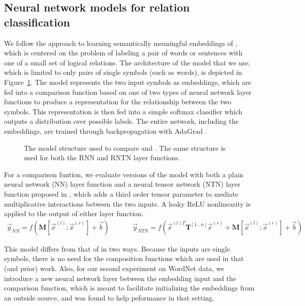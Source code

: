 
\subsection*{Neural network models for relation classification} \label{methods}


We follow the approach to learning semantically meaningful embeddings 
of \citet{Bowman:Potts:Manning:2014}, which is centered on the problem of
labeling a pair of words or sentences with one of a small set of logical
relations. The architecture of the model that we use, which is limited
to only pairs of single symbols (such as words), is depicted in
Figure~\ref{sample-figure}. The model represents the two input symbols
as embeddings, which are fed into a comparison function based on one
of two types of neural network layer functions to produce a representation
for the relationship between the two symbols. This representation is then
fed into a simple softmax classifier which outputs a distribution over
possible labels. The entire network, including the embeddings, are trained
through backpropagation with AdaGrad \cite{duchi2011adaptive}.

\begin{figure}[tp]
  \centering
  
  \caption{The model structure used to compare  and . 
    The same structure is used for both the RNN and RNTN layer functions.} 
  \label{sample-figure}
\end{figure}

For a comparison funtion, we evaluate versions of the model with both a plain neural
network (NN) layer function and a neural tensor network (NTN) layer function
proposed in \citet{chen2013learning}, which adds a third order tensor parameter
to mediate multiplicative interactions between the two inputs. A leaky ReLU
nonlinearity \cite{maasrectifier} is applied to the output of either
layer function.
%
\begin{gather} \label{rnn}
\vec{y}_{\textit{NN}} = f(\mathbf{M} [\vec{x}^{(l)}; \vec{x}^{(r)}] + \vec{b}) ~~~~~~~~~~~~~~~ \vec{y}_{\textit{NTN}} = f(\vec{x}^{(l)T} \mathbf{T}^{[1 \ldots n]} \vec{x}^{(r)} + \mathbf{M} [\vec{x}^{(l)}; \vec{x}^{(r)}] + \vec{b})
\end{gather} 
%

This model differs from that of \citet{Bowman:Potts:Manning:2014} in two ways. Because 
the inputs are single symbols, there is no need for the composition functions
which are used in that (and prior) work. Also, for our second experiment on 
WordNet data, we introduce a new neural network layer between the embedding input
and the comparison function, which is meant to facilitate initializing the embeddings
from an outside source, and was found to help peformance in that setting.


